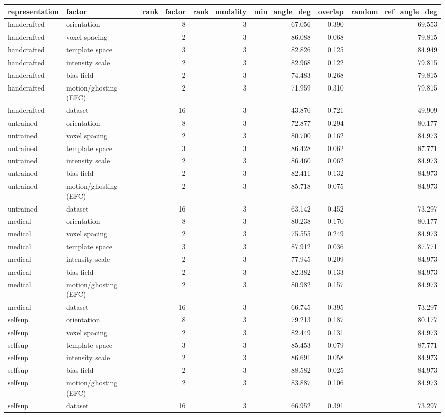 \begin{tabular}{llrrrrr}
\toprule
representation & factor & rank\_factor & rank\_modality & min\_angle\_deg & overlap & random\_ref\_angle\_deg \\
\midrule
handcrafted & orientation & 8 & 3 & 67.056 & 0.390 & 69.553 \\
handcrafted & voxel spacing & 2 & 3 & 86.088 & 0.068 & 79.815 \\
handcrafted & template space & 3 & 3 & 82.826 & 0.125 & 84.949 \\
handcrafted & intensity scale & 2 & 3 & 82.968 & 0.122 & 79.815 \\
handcrafted & bias field & 2 & 3 & 74.483 & 0.268 & 79.815 \\
handcrafted & motion/ghosting (EFC) & 2 & 3 & 71.959 & 0.310 & 79.815 \\
handcrafted & dataset & 16 & 3 & 43.870 & 0.721 & 49.909 \\
untrained & orientation & 8 & 3 & 72.877 & 0.294 & 80.177 \\
untrained & voxel spacing & 2 & 3 & 80.700 & 0.162 & 84.973 \\
untrained & template space & 3 & 3 & 86.428 & 0.062 & 87.771 \\
untrained & intensity scale & 2 & 3 & 86.460 & 0.062 & 84.973 \\
untrained & bias field & 2 & 3 & 82.411 & 0.132 & 84.973 \\
untrained & motion/ghosting (EFC) & 2 & 3 & 85.718 & 0.075 & 84.973 \\
untrained & dataset & 16 & 3 & 63.142 & 0.452 & 73.297 \\
medical & orientation & 8 & 3 & 80.238 & 0.170 & 80.177 \\
medical & voxel spacing & 2 & 3 & 75.555 & 0.249 & 84.973 \\
medical & template space & 3 & 3 & 87.912 & 0.036 & 87.771 \\
medical & intensity scale & 2 & 3 & 77.945 & 0.209 & 84.973 \\
medical & bias field & 2 & 3 & 82.382 & 0.133 & 84.973 \\
medical & motion/ghosting (EFC) & 2 & 3 & 80.982 & 0.157 & 84.973 \\
medical & dataset & 16 & 3 & 66.745 & 0.395 & 73.297 \\
selfsup & orientation & 8 & 3 & 79.213 & 0.187 & 80.177 \\
selfsup & voxel spacing & 2 & 3 & 82.449 & 0.131 & 84.973 \\
selfsup & template space & 3 & 3 & 85.453 & 0.079 & 87.771 \\
selfsup & intensity scale & 2 & 3 & 86.691 & 0.058 & 84.973 \\
selfsup & bias field & 2 & 3 & 88.582 & 0.025 & 84.973 \\
selfsup & motion/ghosting (EFC) & 2 & 3 & 83.887 & 0.106 & 84.973 \\
selfsup & dataset & 16 & 3 & 66.952 & 0.391 & 73.297 \\
\bottomrule
\end{tabular}
